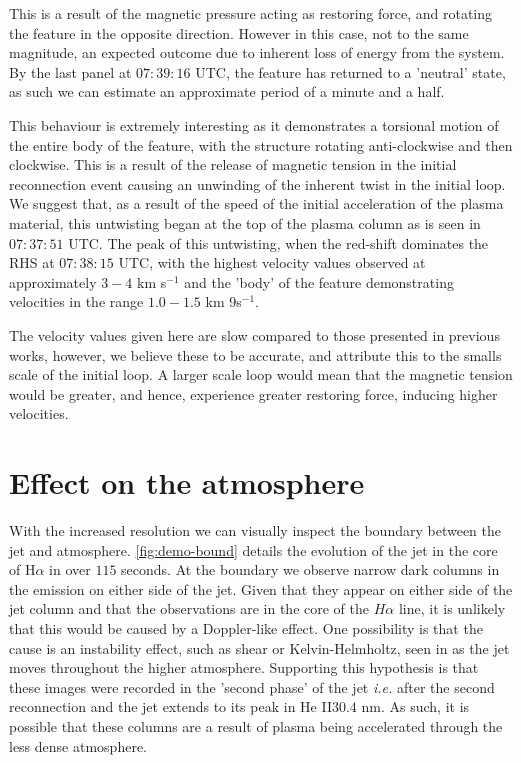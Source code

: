 This is a result of the magnetic pressure acting as restoring force, and rotating the feature in the opposite direction. 
However in this case, not to the same magnitude, an expected outcome due to inherent loss of energy from the system.
By the last panel at $07:39:16$ UTC, the feature has returned to a 'neutral' state, as such we can estimate an approximate period of a minute and a half.

This behaviour is extremely interesting as it demonstrates a torsional motion of the entire body of the feature, with the structure rotating anti-clockwise and then clockwise.
This is a result of the release of magnetic tension in the initial reconnection event causing an unwinding of the inherent twist in the initial loop.
We suggest that, as a result of the speed of the initial acceleration of the plasma material, this untwisting began at the top of the plasma column as is seen in $07:37:51$ UTC.
The peak of this untwisting, when the red-shift dominates the RHS at $07:38:15$ UTC, with the highest velocity values observed at approximately $3-4$ km s${^{-1}}$ and the 'body' of the feature demonstrating velocities in the range $1.0-1.5$ km 9s${^{-1}}$.

The velocity values given here are slow compared to those presented in previous works, however, we believe these to be accurate, and attribute this to the smalls scale of the initial loop.
A larger scale loop would mean that the magnetic tension would be greater, and hence, experience greater restoring force, inducing higher velocities.

  









\section{Effect on the atmosphere}
\label{sec:temp-map-sect}

With the increased resolution we can visually inspect the boundary between the jet and atmosphere.
\cref{fig:demo-bound} details the evolution of the jet in the core of H$\alpha$ in over $115$ seconds.
At the boundary we observe narrow dark columns in the emission on either side of the jet.
Given that they appear on either side of the jet column and that the observations are in the core of the $H\alpha$ line, it is unlikely that this would be caused by a Doppler-like effect.
One possibility is that the cause is an instability effect, such as shear or Kelvin-Helmholtz, seen in \cite{Zaqarashvili2014} as the jet moves throughout the higher atmosphere.
Supporting this hypothesis is that these images were recorded in the 'second phase' of the jet \emph{i.e.} after the second reconnection and the jet extends to its peak in He II$30.4$ nm. 
As such, it is possible that these columns are a result of plasma being accelerated through the less dense atmosphere.

